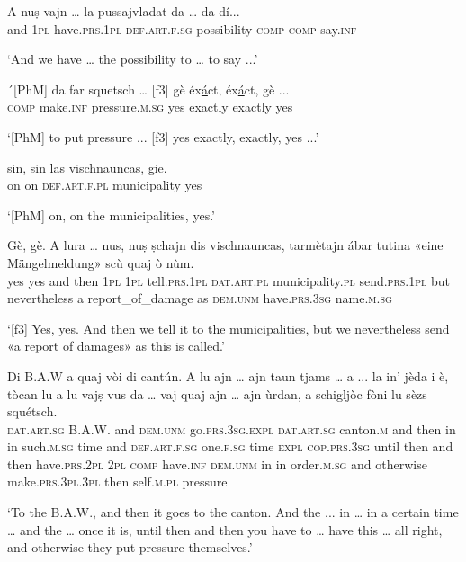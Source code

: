 \begin{linenumbers}
\gll  A nuṣ vajn … la pussajvladat da … da dí...  \\
and \textsc{1pl} have.\textsc{prs.1pl} {} \textsc{def.art.f.sg} possibility \textsc{comp} {} \textsc{comp} say.\textsc{inf}   \\
\end{linenumbers}
\medskip
\glt `And we have … the possibility to … to say ...'
\medskip

\begin{linenumbers}
\gll ´[PhM] da far squetsch … [f3] gè éx\underline{á}ct, éx\underline{á}ct, gè ...  \\
\textsc{} \textsc{comp} make.\textsc{inf} pressure.\textsc{m.sg} {} \textsc{} yes exactly exactly yes \\
\end{linenumbers}
\medskip
\glt `[PhM] to put pressure ... [f3] yes exactly, exactly, yes ...'
\medskip

\begin{linenumbers}
\gll [PhM] sin, sin las vischnauncas, gie.   \\
\textsc{} on on \textsc{def.art.f.pl} municipality yes\\
\end{linenumbers}
\medskip
\glt `[PhM] on, on the municipalities, yes.'
\medskip

\begin{linenumbers}
\gll  [f3] Gè, gè. A lura … nus, nuṣ ṣchajn dis vischnauncas, tarmètajn ábar tutina «eine Mängelmeldung»\footnotemark{} scù quaj ò nùm.  \\
\textsc{} yes yes and then {} \textsc{1pl} \textsc{1pl} tell.\textsc{prs.1pl} \textsc{dat.art.pl} municipality.\textsc{pl} send.\textsc{prs.1pl} but nevertheless a report\_of\_damage as \textsc{dem.unm} have.\textsc{prs.3sg} name.\textsc{m.sg}\\
\end{linenumbers}
\medskip
\glt `[f3] Yes, yes. And then we tell it to the municipalities, but we nevertheless send «a report of damages» as this is called.'
\medskip

\begin{linenumbers} 
\gll  Di B.A.W a quaj vòi di cantún. A lu ajn … ajn taun tjams … a ... la in’ jèda i è, tòcan lu a lu vajṣ vus da … vaj quaj ajn … ajn ùrdan, a schigljòc fòni lu sèzs squétsch.\\
\textsc{dat.art.sg} B.A.W. and \textsc{dem.unm} go.\textsc{prs.3sg.expl} \textsc{dat.art.sg} canton.\textsc{m} and then in {} in such.\textsc{m.sg} time {} and {} \textsc{def.art.f.sg} one.\textsc{f.sg} time \textsc{expl} \textsc{cop.prs.3sg} until then and then have.\textsc{prs.2pl} \textsc{2pl} \textsc{comp} {} have.\textsc{inf} \textsc{dem.unm} in {} in order.\textsc{m.sg} and otherwise make.\textsc{prs.3pl.3pl} then self.\textsc{m.pl} pressure\\
\end{linenumbers}
\medskip
\glt `To the B.A.W., and then it goes to the canton. And the ... in … in a certain time … and the … once it is, until then and then you have to … have this … all right, and otherwise they put pressure themselves.'
\medskip

